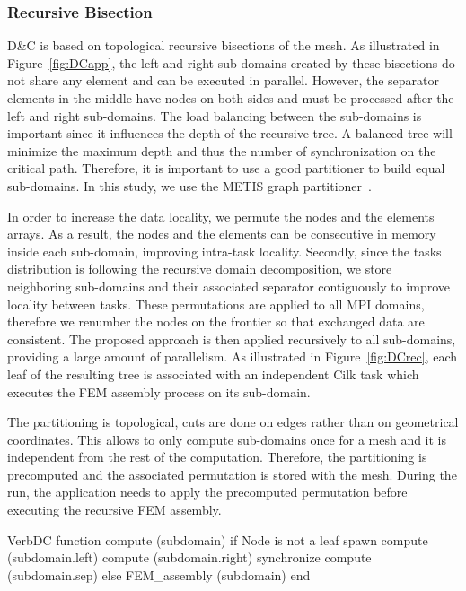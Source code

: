 \documentclass[10pt]{IOS-Book-Article}
\begin{document}
\subsubsection{Recursive Bisection}
\label{sec:DCrec}
D\&C is based on topological recursive bisections of the mesh.
As illustrated in Figure~\ref{fig:DCapp}, the left and right sub-domains created by these bisections do not share any element and can be executed in parallel.
However, the separator elements in the middle have nodes on both sides and must be processed after the left and right sub-domains.
The load balancing between the sub-domains is important since it influences the depth of the recursive tree.
A balanced tree will minimize the maximum depth and thus the number of synchronization on the critical path.
Therefore, it is important to use a good partitioner to build equal sub-domains.
In this study, we use the METIS graph partitioner~\cite{Metis}.

In order to increase the data locality, we permute the nodes and the elements arrays.
As a result, the nodes and the elements can be consecutive in memory inside each sub-domain, improving intra-task locality.
Secondly, since the tasks distribution is following the recursive domain decomposition, we store neighboring sub-domains and their associated separator contiguously to improve locality between tasks.
These permutations are applied to all MPI domains, therefore we renumber the nodes on the frontier so that exchanged data are consistent.
The proposed approach is then applied recursively to all sub-domains, providing a large amount of parallelism.
As illustrated in Figure~\ref{fig:DCrec}, each leaf of the resulting tree is associated with an independent Cilk task which executes the FEM assembly process on its sub-domain.

The partitioning is topological, cuts are done on edges rather than on geometrical coordinates.
This allows to only compute sub-domains once for a mesh and it is independent from the rest of the computation.
Therefore, the partitioning is precomputed and the associated permutation is stored with the mesh.
During the run, the application needs to apply the precomputed permutation before executing the recursive FEM assembly.

\begin{SaveVerbatim}[]{VerbDC}
function compute (subdomain) 
  if Node is not a leaf
    spawn compute (subdomain.left)
    compute (subdomain.right)
    synchronize
    compute (subdomain.sep)
  else
    FEM_assembly (subdomain)
end    
\end{SaveVerbatim}
\end{document}
